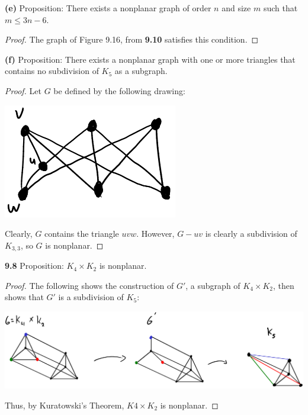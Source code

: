 \documentclass[12pt]{article}
\begin{document}
\textbf{(e)} Proposition: There exists a nonplanar graph of order $n$ and size $m$ such that $m \leq 3n - 6$.
\begin{proof}
    The graph of Figure 9.16, from \textbf{9.10} satisfies this condition.
\end{proof}

\textbf{(f)} Proposition: There exists a nonplanar graph with one or more triangles that contains no subdivision of $K_5$ as a subgraph.
\begin{proof}
    Let $G$ be defined by the following drawing:
    \begin{center}\includegraphics{96f.png}\end{center}
    Clearly, $G$ contains the triangle $uvw$.
    However, $G - uv$ is clearly a subdivision of $K_{3,3}$, so $G$ is nonplanar.
\end{proof}

\newpage\noindent\textbf{9.8} Proposition: $K_4 \times K_2$ is nonplanar.
\begin{proof}
    The following shows the construction of $G'$, a subgraph of $K_4 \times K_2$, then shows that $G'$ is a subdivision of $K_5$:
    \begin{center}\includegraphics[scale=.4]{98.png}\end{center}
    Thus, by Kuratowski's Theorem, $K4 \times K_2$ is nonplanar.
\end{proof}
\end{document}
